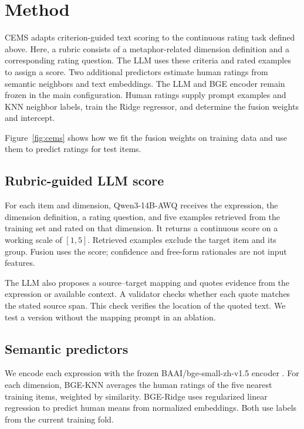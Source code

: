 \section{Method}

CEMS adapts criterion-guided text scoring to the continuous rating task defined above. Here, a rubric consists of a metaphor-related dimension definition and a corresponding rating question. The LLM uses these criteria and rated examples to assign a score. Two additional predictors estimate human ratings from semantic neighbors and text embeddings. The LLM and BGE encoder remain frozen in the main configuration. Human ratings supply prompt examples and KNN neighbor labels, train the Ridge regressor, and determine the fusion weights and intercept.

Figure~\ref{fig:cems} shows how we fit the fusion weights on training data and use them to predict ratings for test items.



\subsection{Rubric-guided LLM score}

For each item and dimension, Qwen3-14B-AWQ receives the expression, the dimension definition, a rating question, and five examples retrieved from the training set and rated on that dimension. It returns a continuous score on a working scale of $[1,5]$. Retrieved examples exclude the target item and its group. Fusion uses the score; confidence and free-form rationales are not input features.

The LLM also proposes a source--target mapping and quotes evidence from the expression or available context. A validator checks whether each quote matches the stated source span. This check verifies the location of the quoted text. We test a version without the mapping prompt in an ablation.

\subsection{Semantic predictors}

We encode each expression with the frozen BAAI/bge-small-zh-v1.5 encoder \citep{xiao2024cpack}. For each dimension, BGE-KNN averages the human ratings of the five nearest training items, weighted by similarity. BGE-Ridge uses regularized linear regression to predict human means from normalized embeddings. Both use labels from the current training fold. 

